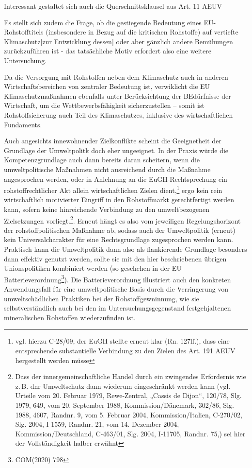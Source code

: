 \documentclass[12pt,a4paper,oneside]{book} %
\begin{document}
Interessant gestaltet sich auch die Querschnittsklausel aus Art. 11 AEUV
	
Es stellt sich zudem die Frage, ob die gestiegende Bedeutung eines EU-Rohstofftitels (insbesondere in Bezug auf die kritischen Rohstoffe) auf vertiefte Klimaschutz[zur Entwicklung dessen]\autocite{Gundel in Tehobald/Kühling, IV, Energieumweltrecht, Rn. 74ff.} oder aber gänzlich andere Bemühungen zurückzuführen ist - das tatsächliche Motiv erfordert also eine weitere Untersuchung.

Da die Versorgung mit Rohstoffen neben dem Klimaschutz auch in anderen Wirtschaftsbereichen von zentraler Bedeutung ist, verwiklicht die EU Klimaschutzmaßnahmen ebenfalls unter Berücksichtung der BEdürfnisse der Wirtschaft, um die Wettbewerbsfähigkeit sicherzustellen -- somit ist Rohstoffsicherung auch Teil des Klimaschutzes, inklusive des wirtschaftlichen Fundaments.\autocite{Frenz 2025, S. 114}
	
Auch angesichts innewohnender Zielkonflikte scheint die Geeignetheit der Grundlage der Umweltpolitk doch eher ungeeignet. In der Praxis würde die Kompetenzgrundlage auch dann bereits daran scheitern, wenn die umweltpolitische Maßnahmen nicht ausreichend durch die Maßnahme angesprochen werden, oder in Anlehnung an die EuGH-Rechtsprechung ein rohstoffrechtlicher Akt allein wirtschaftlichen Zielen dient,\footnote{vgl. hierzu C-28/09, der EuGH stellte erneut klar (Rn. 127ff.), dass eine entsprechende substantielle Verbindung zu den Zielen des Art. 191 AEUV hergestellt werden müsse} ergo kein rein wirtschaftlich motivierter Eingriff in den Rohstoffmarkt gerechtfertigt werden kann, sofern keine hinreichende Verbindung zu den umweltbezogenen Zielsetzungen vorliegt.\footnote{Dass der innergemeinschaftliche Handel durch ein zwingendes Erfordernis wie z.\,B. dnr Umweltschutz dann wiederum eingeschränkt werden kann (vgl. Urteile vom 20. Februar 1979, Rewe-Zentral, „Cassis de Dijon“, 120/78, Slg. 1979, 649, vom 20. September 1988, Kommission/Dänemark, 302/86, Slg. 1988, 4607, Randnr. 9, vom 5. Februar 2004, Kommission/Italien, C‑270/02, Slg. 2004, I‑1559, Randnr. 21, vom 14. Dezember 2004, Kommission/Deutschland, C‑463/01, Slg. 2004, I‑11705, Randnr. 75,) sei hier der Vollständigkeit halber erwähnt}. Erneut hängt es also vom jeweiligen Regelungshorizont der rohstoffpolitischen Maßnahme ab, sodass auch der Umweltpolitik (erneut) kein Universalcharakter für eine Rechtsgrundlage zugesprochen werden kann. Praktisch kann die Umweltpolitik dann also als flankierende Grundlage besonders dann effektiv genutzt werden, sollte sie mit den hier beschriebenen übrigen Unionspolitiken kombiniert werden (so geschehen in der EU-Batterieverordnung\footnote{COM(2020) 798}). Die Batterieverordnung illustriert auch den konkreten Anwendungsfall für eine umweltpolitische Basis durch die Verringerung von umweltschädlichen Praktiken bei der Rohstoffgewninnung, wie sie selbstverständlich auch bei den im Untersuchungsgegenstand festgehjaltenen mineralischen Rohstoffen wiederzufinden ist.
	
\end{document}

